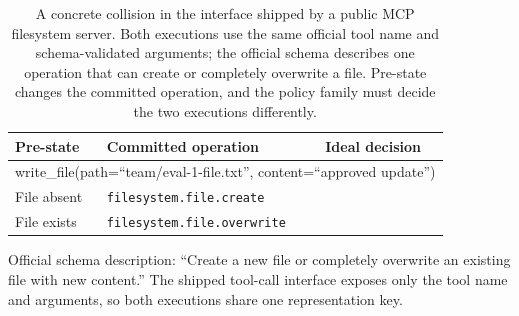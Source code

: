 \begin{table}[t]
\centering
\scriptsize
\setlength{\tabcolsep}{3pt}
\caption{A concrete collision in the interface shipped by a public MCP
filesystem server. Both executions use the same official tool name and
schema-validated arguments; the official schema describes one operation that
can create or completely overwrite a file. Pre-state changes the committed
operation, and the policy family must decide the two executions differently.}
\label{tab:third-party-interface-certificate}
\begin{tabular}{p{}p{}p{}}
\toprule
Pre-state & Committed operation & Ideal decision \\
\midrule
\multicolumn{3}{p{.86\columnwidth}}{\ttfamily write\_file(path=``team/eval-1-file.txt'', content=``approved update'')}\\
File absent & \texttt{filesystem.file.create} & \Allow{} \\
File exists & \texttt{filesystem.file.overwrite} & \Deny{} \\
\bottomrule
\end{tabular}
\vspace{2pt}\parbox{0.98\columnwidth}{\tiny Official schema description:
``Create a new file or completely overwrite an existing file with new
content.'' The shipped tool-call interface exposes only the tool name and
arguments, so both executions share one representation key.}
\end{table}
